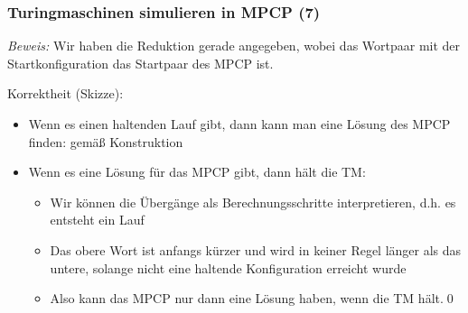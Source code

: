 \documentclass[onlymath]{beamer}
\begin{document}
\begin{frame}\frametitle{Turingmaschinen simulieren in MPCP (7)}


\emph{Beweis:} Wir haben die Reduktion gerade angegeben, wobei das Wortpaar
mit der Startkonfiguration das Startpaar des MPCP ist.
\bigskip

Korrektheit (Skizze):
\begin{itemize}
\item Wenn es einen haltenden Lauf gibt, dann kann man eine Lösung des MPCP finden: gemäß Konstruktion
\item Wenn es eine Lösung für das MPCP gibt, dann hält die TM:
	\begin{itemize}
	\item Wir können die Übergänge als Berechnungsschritte interpretieren, d.h. es entsteht ein Lauf
	\item Das obere Wort ist anfangs kürzer und wird in keiner Regel länger als das untere, solange nicht eine haltende Konfiguration erreicht wurde
	\item Also kann das MPCP nur dann eine Lösung haben, wenn die TM hält.\qed
	\end{itemize}
\end{itemize}

\end{frame}
\end{document}
